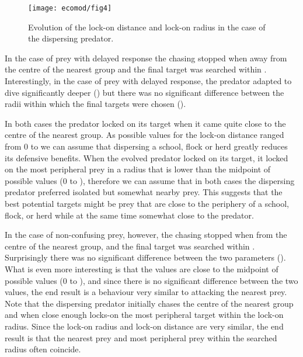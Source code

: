 \begin{figure}
  \texttt{[image: ecomod/fig4]}
  \caption{Evolution of the lock-on distance and lock-on radius in the case of the dispersing predator.}
  \label{fig:dispersing:evo}
\end{figure}

In the case of prey with delayed response the chasing stopped when   away from the centre of the nearest group and the final target was searched within  . Interestingly, in the case of prey with delayed response, the predator adapted to dive significantly deeper  () but there was no significant difference between the radii within which the final targets were chosen ().

In both cases the predator locked on its target when it came quite close to the centre of the nearest group. As possible values for the lock-on distance ranged from 0 to  we can assume that dispersing a school, flock or herd greatly reduces its defensive benefits. When the evolved predator locked on its target, it locked on the most peripheral prey in a radius that is lower than the midpoint of possible values (0 to ), therefore we can assume that in both cases the dispersing predator preferred isolated but somewhat nearby prey. This suggests that the best potential targets might be prey that are close to the periphery of a school, flock, or herd while at the same time somewhat close to the predator.

In the case of non-confusing prey, however, the chasing stopped when   from the centre of the nearest group, and the final target was searched within  . Surprisingly there was no significant difference between the two parameters (). What is even more interesting is that the values are close to the midpoint of possible values (0 to ), and since there is no significant difference between the two values, the end result is a behaviour very similar to attacking the nearest prey. Note that the dispersing predator initially chases the centre of the nearest group and when close enough locks-on the most peripheral target within the lock-on radius. Since the lock-on radius and lock-on distance are very similar, the end result is that the nearest prey and most peripheral prey within the searched radius often coincide.

